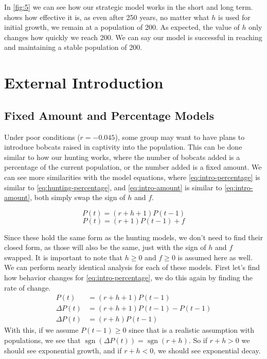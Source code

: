 \documentclass{article}
\DeclareMathOperator{\sgn}{sgn}
\begin{document}
In \cref{fig:5} we can see how our strategic model works in the short and long term.  shows how effective it is, as even after 250 years, no matter what $h$ is used for initial growth, we remain at a population of 200. As expected, the value of $h$ only changes how quickly we reach 200. We can say our model is successful in reaching and maintaining a stable population of 200.

\section{External Introduction}
\subsection{Fixed Amount and Percentage Models}
Under poor conditions ($r = -0.045$), some group may want to have plans to introduce bobcats raised in captivity into the population. This can be done similar to how our hunting works, where the number of bobcats added is a percentage of the current population, or the number added is a fixed amount. We can see more similarities with the model equations, where \cref{eq:intro-percentage} is similar to \cref{eq:hunting-percentage}, and \cref{eq:intro-amount} is similar to \cref{eq:intro-amount}, both simply swap the sign of $h$ and $f$.

\begin{equation} \label{eq:intro-percentage}
    P(t)=(r+h+1)P(t-1)
\end{equation}
\begin{equation} \label{eq:intro-amount}
    P(t)=(r+1)P(t-1)+f
\end{equation}

Since these hold the same form as the hunting models, we don't need to find their closed form, as those will also be the same, just with the sign of $h$ and $f$ swapped. It is important to note that $h \ge 0$ and $f \ge 0$ is assumed here as well. We can perform nearly identical analysis for each of these models. First let's find how behavior changes for \cref{eq:intro-percentage}, we do this again by finding the rate of change.
\begin{align*}
    P(t) &= (r+h+1)P(t-1) \\
    \Delta P(t) &= (r+h+1)P(t-1) - P(t-1) \\
    \Delta P(t) &= (r+h)P(t-1)
\end{align*}
With this, if we assume $P(t-1) \ge 0$ since that is a realistic assumption with populations, we see that $\sgn(\Delta P(t)) = \sgn(r+h)$. So if $r+h > 0$ we should see exponential growth, and if $r+h < 0$, we should see exponential decay.
\end{document}
